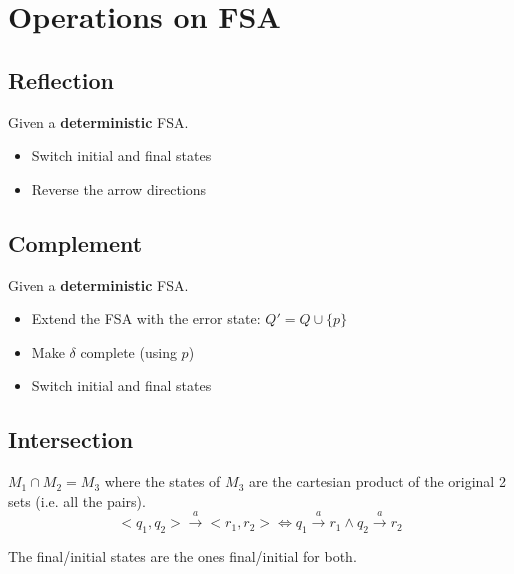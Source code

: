 \section{Operations on FSA}

\subsection{Reflection}
Given a \textbf{deterministic} FSA.
\begin{itemize}
    \item Switch initial and final states
    \item Reverse the arrow directions
\end{itemize}

\subsection{Complement}
Given a \textbf{deterministic} FSA.
\begin{itemize}
    \item Extend the FSA with the error state: $Q' = Q \cup \{p\}$
    \item Make $\delta$ complete (using $p$)
    \item Switch initial and final states
\end{itemize}

\subsection{Intersection}
$M_1 \cap M_2 = M_3$ where the states of $M_3$ are the cartesian product of the original 2 sets (i.e. all the pairs).
\[
    <q_1, q_2> \xrightarrow{a} <r_1,r_2> \iff q_1\xrightarrow{a} r_1 \land q_2 \xrightarrow{a} r_2
\]

The final/initial states are the ones final/initial for both.
